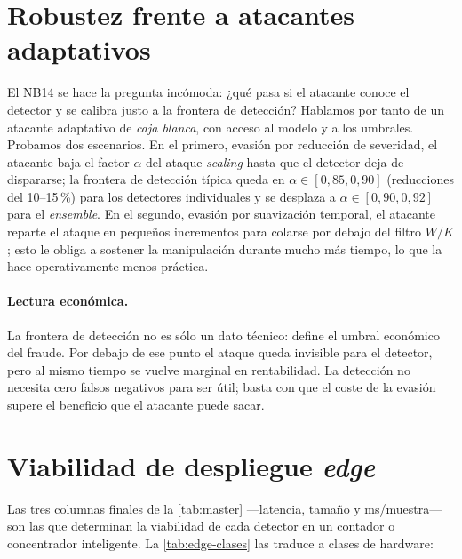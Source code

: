 \section{Robustez frente a atacantes adaptativos}
\label{sec:resultados-adversarial}

El NB14 se hace la pregunta incómoda: ¿qué pasa si el atacante conoce el detector y se calibra justo a la frontera de detección? Hablamos por tanto de un atacante adaptativo de \textit{caja blanca}, con acceso al modelo y a los umbrales. Probamos dos escenarios. En el primero, evasión por reducción de severidad, el atacante baja el factor $\alpha$ del ataque \textit{scaling} hasta que el detector deja de dispararse; la frontera de detección típica queda en $\alpha\in[0{,}85, 0{,}90]$ (reducciones del 10--15\,\%) para los detectores individuales y se desplaza a $\alpha\in[0{,}90, 0{,}92]$ para el \textit{ensemble}. En el segundo, evasión por suavización temporal, el atacante reparte el ataque en pequeños incrementos para colarse por debajo del filtro $W/K$; esto le obliga a sostener la manipulación durante mucho más tiempo, lo que la hace operativamente menos práctica.

\paragraph{Lectura económica.} La frontera de detección no es sólo un dato técnico: define el umbral económico del fraude. Por debajo de ese punto el ataque queda invisible para el detector, pero al mismo tiempo se vuelve marginal en rentabilidad. La detección no necesita cero falsos negativos para ser útil; basta con que el coste de la evasión supere el beneficio que el atacante puede sacar.

\section{Viabilidad de despliegue \textit{edge}}
\label{sec:resultados-edge}

Las tres columnas finales de la \cref{tab:master} ---latencia, tamaño y ms/muestra--- son las que determinan la viabilidad de cada detector en un contador o concentrador inteligente. La \cref{tab:edge-clases} las traduce a clases de hardware:

